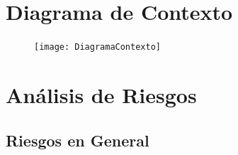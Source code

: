 \documentclass[12pt, fleqn]{report}                             %
\begin{document}
    \clearpage
    \section{Diagrama de Contexto}

        \begin{figure}[h]
            \centering
            \texttt{[image: DiagramaContexto]}
        \end{figure}


    \clearpage
    \section{Análisis de Riesgos}

        \subsection{Riesgos en General}
\end{document}
